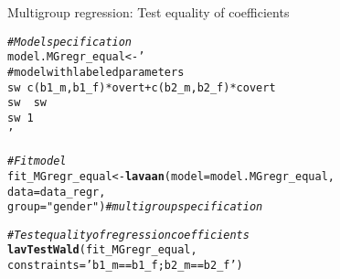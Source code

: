 \documentclass[10pt]{beamer}\usepackage[]{graphicx}\usepackage[]{xcolor}
\makeatletter
\newcommand{\hlsng}[1]{\textcolor[rgb]{0.192,0.494,0.8}{#1}}%
\newcommand{\hlcom}[1]{\textcolor[rgb]{0.678,0.584,0.686}{\textit{#1}}}%
\newcommand{\hldef}[1]{\textcolor[rgb]{0.345,0.345,0.345}{#1}}%
\newcommand{\hlkwb}[1]{\textcolor[rgb]{0.69,0.353,0.396}{#1}}%
\newcommand{\hlkwc}[1]{\textcolor[rgb]{0.333,0.667,0.333}{#1}}%
\newcommand{\hlkwd}[1]{\textcolor[rgb]{0.737,0.353,0.396}{\textbf{#1}}}%
\newenvironment{kframe}{%
 \def\at@end@of@kframe{}%
 \ifinner\ifhmode%
  \def\at@end@of@kframe{\end{minipage}}%
  \begin{minipage}{\columnwidth}%
 \fi\fi%
 \def\FrameCommand##1{\hskip\@totalleftmargin \hskip-\fboxsep
 \colorbox{shadecolor}{##1}\hskip-\fboxsep
     \hskip-\linewidth \hskip-\@totalleftmargin \hskip\columnwidth}%
 \MakeFramed {\advance\hsize-\width
   \@totalleftmargin\z@ \linewidth\hsize
   \@setminipage}}%
 {\par\unskip\endMakeFramed%
 \at@end@of@kframe}
\newenvironment{knitrout}{}{} %
\makeatother
\begin{document}
%
%
\begin{frame}[fragile]{Multigroup regression: Test equality of coefficients}

\begin{knitrout}
\color{fgcolor}\begin{kframe}
\begin{alltt}
\hlcom{# Model specification}
\hldef{model.MGregr_equal} \hlkwb{<-} \hlsng{'
  # model with labeled parameters
  sw ~ c(b1_m,b1_f)*overt + c(b2_m,b2_f)*covert 
  sw ~~ sw                                      
  sw ~ 1                                        
'}

\hlcom{# Fit model}
\hldef{fit_MGregr_equal} \hlkwb{<-} \hlkwd{lavaan}\hldef{(}\hlkwc{model} \hldef{= model.MGregr_equal,}
                    \hlkwc{data} \hldef{= data_regr,}
                    \hlkwc{group} \hldef{=} \hlsng{"gender"}\hldef{)} \hlcom{# multigroup specification }

\hlcom{# Test equality of regression coefficients}
\hlkwd{lavTestWald}\hldef{(fit_MGregr_equal,}
            \hlkwc{constraints} \hldef{=} \hlsng{'b1_m == b1_f; b2_m == b2_f'}\hldef{)}
\end{alltt}
\end{kframe}
\end{knitrout}

\end{frame}


                    
  
\end{document}
